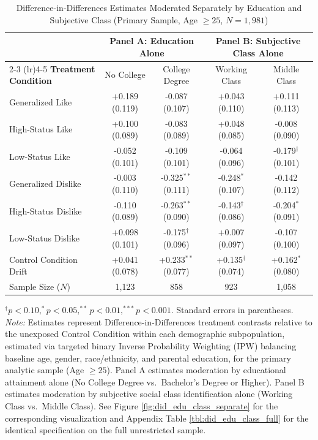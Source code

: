 \begin{table}[ht!]
\centering
\small
\caption{Difference-in-Differences Estimates Moderated Separately by Education and Subjective Class (Primary Sample, Age $\ge 25$, $N = 1{,}981$)}
\label{tbl:did_edu_class_primary}
\setlength{\tabcolsep}{2.0pt}
\begin{tabular*}{\linewidth}{@{\extracolsep{\fill}}lcccc@{}}
\toprule
& \multicolumn{2}{c}{\textbf{Panel A: Education Alone}} & \multicolumn{2}{c}{\textbf{Panel B: Subjective Class Alone}} \\
\cmidrule(lr){2-3} \cmidrule(lr){4-5}
\textbf{Treatment Condition} & No College & College Degree & Working Class & Middle Class \\
\midrule
Generalized Like & +0.189 (0.119) & -0.087 (0.107) & +0.043 (0.110) & +0.111 (0.113) \\
High-Status Like & +0.100 (0.089) & -0.083 (0.089) & +0.048 (0.085) & -0.008 (0.090) \\
Low-Status Like & -0.052 (0.101) & -0.109 (0.101) & -0.064 (0.096) & -0.179$^{\dagger}$ (0.101) \\
Generalized Dislike & -0.003 (0.110) & -0.325$^{**}$ (0.111) & -0.248$^{*}$ (0.107) & -0.142 (0.112) \\
High-Status Dislike & -0.110 (0.089) & -0.263$^{**}$ (0.090) & -0.143$^{\dagger}$ (0.086) & -0.204$^{*}$ (0.091) \\
Low-Status Dislike & +0.098 (0.101) & -0.175$^{\dagger}$ (0.096) & +0.007 (0.097) & -0.107 (0.100) \\
\midrule
Control Condition Drift & +0.041 (0.078) & +0.233$^{**}$ (0.077) & +0.135$^{\dagger}$ (0.074) & +0.162$^{*}$ (0.080) \\
Sample Size ($N$) & 1,123 & 858 & 923 & 1,058 \\
\bottomrule
\end{tabular*}
\begin{minipage}{\linewidth}
\vspace{4pt}
\footnotesize
$^{\dagger}p < 0.10, ^{*}p < 0.05, ^{**}p < 0.01, ^{***}p < 0.001$. Standard errors in parentheses. \newline
\textit{Note:} Estimates represent Difference-in-Differences treatment contrasts relative to the unexposed Control Condition within each demographic subpopulation, estimated via targeted binary Inverse Probability Weighting (IPW) balancing baseline age, gender, race/ethnicity, and parental education, for the primary analytic sample (Age $\ge 25$). Panel A estimates moderation by educational attainment alone (No College Degree vs.\ Bachelor's Degree or Higher). Panel B estimates moderation by subjective social class identification alone (Working Class vs.\ Middle Class). See Figure \ref{fig:did_edu_class_separate} for the corresponding visualization and Appendix Table \ref{tbl:did_edu_class_full} for the identical specification on the full unrestricted sample.
\end{minipage}
\end{table}
